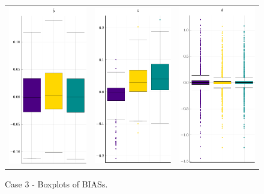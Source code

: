\begin{figure}[ht]
	
	\centering
	\begin{tabular}[b]{c c c}
		\includegraphics[width=.3\textwidth]{Figures/3/BIAS_b.pdf} & \includegraphics[width=.3\textwidth]{Figures/3/BIAS_a.pdf} & \includegraphics[width=.3\textwidth]{Figures/3/BIAS_t.pdf}
	\end{tabular}
	\caption{Case 3 - Boxplots of BIASs.}
	\label{fig:bpBIAS3}
\end{figure}
